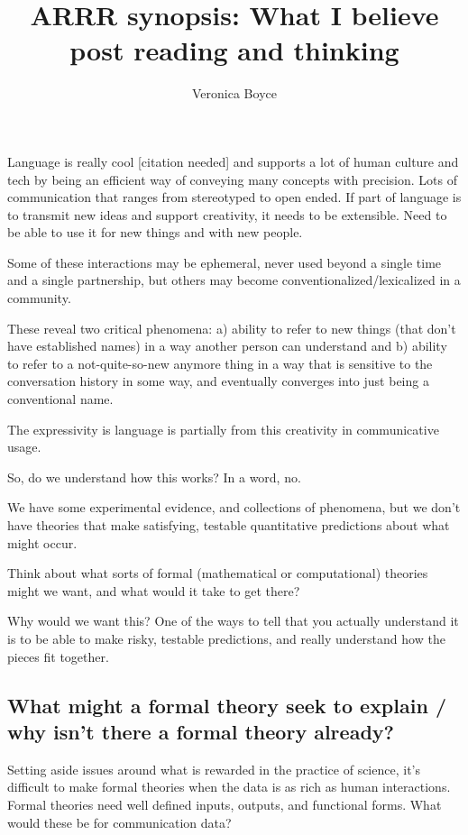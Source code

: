 \documentclass[]{article}
\title{ARRR synopsis: What I believe post reading and thinking}
\author{Veronica Boyce}
\begin{document}
	
	\maketitle
	
	
	Language is really cool [citation needed] and supports a lot of human culture and tech by being an efficient way of conveying many concepts with precision. Lots of communication that ranges from stereotyped to open ended. If part of language is to transmit new ideas and support creativity, it needs to be extensible. Need to be able to use it for new things and with new people. 
	
	Some of these interactions may be ephemeral, never used beyond a single time and a single partnership, but others may become conventionalized/lexicalized in a community. 
	
	These reveal two critical phenomena: a) ability to refer to new things (that don't have established names) in a way another person can understand and b) ability to refer to a not-quite-so-new anymore thing in a way that is sensitive to the conversation history in some way, and eventually converges into just being a conventional name. 
	
	The expressivity is language is partially from this creativity in communicative usage. 
	
	So, do we understand how this works? In a word, no. 
	
	We have some experimental evidence, and collections of phenomena, but we don't have theories that make satisfying, testable quantitative predictions about what might occur. 
	
	Think about what sorts of formal (mathematical or computational) theories might we want, and what would it take to get there? 
	
	Why would we want this? One of the ways to tell that you actually understand it is to be able to make risky, testable predictions, and really understand how the pieces fit together. 
	
	\subsection{What might a formal theory seek to explain / why isn't there a formal theory already?} Setting aside issues around what is rewarded in the practice of science, it's difficult to make formal theories when the data is as rich as human interactions. Formal theories need well defined inputs, outputs, and functional forms. What would these be for communication data? 
	
\end{document}
